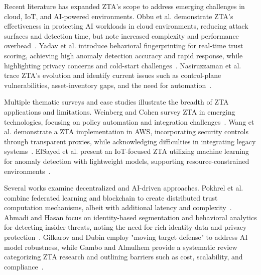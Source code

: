 \documentclass[conference]{IEEEtran}
\begin{document}
Recent literature has expanded ZTA's scope to address emerging challenges in cloud, IoT, and AI-powered environments. Obbu et al. demonstrate ZTA's effectiveness in protecting AI workloads in cloud environments, reducing attack surfaces and detection time, but note increased complexity and performance overhead~\cite{obbu2023cloud}. Yadav et al. introduce behavioral fingerprinting for real-time trust scoring, achieving high anomaly detection accuracy and rapid response, while highlighting privacy concerns and cold-start challenges~\cite{yadav2023behavioral}. Nasiruzzaman et al. trace ZTA's evolution and identify current issues such as control-plane vulnerabilities, asset-inventory gaps, and the need for automation~\cite{nasiruzzaman2023evolution}.

Multiple thematic surveys and case studies illustrate the breadth of ZTA applications and limitations. Weinberg and Cohen survey ZTA in emerging technologies, focusing on policy automation and integration challenges~\cite{weinberg2023survey}. Wang et al. demonstrate a ZTA implementation in AWS, incorporating security controls through transparent proxies, while acknowledging difficulties in integrating legacy systems~\cite{wang2023aws}. ElSayed et al. present an IoT-focused ZTA utilizing machine learning for anomaly detection with lightweight models, supporting resource-constrained environments~\cite{elsayed2023iot}.

Several works examine decentralized and AI-driven approaches. Pokhrel et al. combine federated learning and blockchain to create distributed trust computation mechanisms, albeit with additional latency and complexity~\cite{pokhrel2023federated}. Ahmadi and Hasan focus on identity-based segmentation and behavioral analytics for detecting insider threats, noting the need for rich identity data and privacy protection~\cite{ahmadi2023identity, hasan2023insider}. Gilkarov and Dubin employ "moving target defense" to address AI model robustness, while Gambo and Almulhem provide a systematic review categorizing ZTA research and outlining barriers such as cost, scalability, and compliance~\cite{gilkarov2023moving, gambo2023systematic}.
\end{document}
